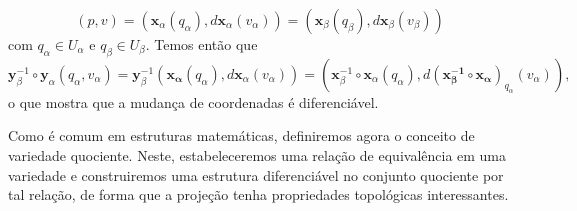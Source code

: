 	\begin{equation*}
		(p, v)=(\mathbf{x}_{\alpha}(q_{\alpha}), d\mathbf{x}_{\alpha}(v_{\alpha}))=(\mathbf{x}_{\beta}(q_{\beta}), d\mathbf{x}_{\beta}(v_{\beta}))
	\end{equation*}
	com $q_{\alpha} \in U_{\alpha}$ e $q_{\beta} \in U_{\beta}$. Temos então que
	\begin{equation*}
		\mathbf{y}_{\beta}^{-1} \circ \mathbf{y}_{\alpha}(q_{\alpha}, v_{\alpha})=\mathbf{y}_{\beta}^{-1}(\mathbf{x_{\alpha}}(q_{\alpha}), d\mathbf{x}_{\alpha}(v_{\alpha})) = (\mathbf{x}_{\beta}^{-1} \circ  \mathbf{x}_{\alpha}(q_{\alpha}), d(\mathbf{x_{\beta}^{-1}} \circ  \mathbf{x_{\alpha}})_{q_{\alpha}}(v_{\alpha})),
	\end{equation*}
	o que mostra que a mudança de coordenadas é diferenciável.

	Como é comum em estruturas matemáticas, definiremos agora o conceito de variedade quociente. Neste, estabeleceremos uma relação de equivalência em uma variedade e construiremos uma estrutura diferenciável no conjunto quociente por tal relação, de forma que a projeção tenha propriedades topológicas interessantes.

